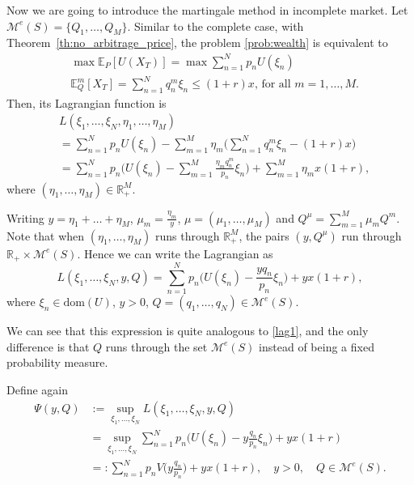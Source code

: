 \documentclass[a4paper]{article}
\theoremstyle{definition}
\numberwithin{equation}{section}
\begin{document}
Now we are going to introduce the martingale method in incomplete market. Let $\mathcal M^e(S)=\{Q_1,\dots,Q_M\}$.
Similar to the complete case, with Theorem~\ref{th:no_arbitrage_price}, the problem \eqref{prob:wealth} is equivalent to
\begin{equation}\label{incomplete problem}
\begin{aligned}
&\max\mathbb E_P[U(X_T)]=\max\sum^N_{n=1}p_nU(\xi_n)\\
&\mathbb E_Q^m[X_T]=\sum^N_{n=1}q^m_n\xi_n\leq (1+r)x\text{, for all }m=1,\dots,M.
\end{aligned}
\end{equation}
Then, its Lagrangian function is
\begin{equation}\nonumber
\begin{aligned}
&L(\xi_1,\dots,\xi_N,\eta_1,\dots,\eta_M)\\
&=\sum^N_{n=1}p_nU(\xi_n)-\sum^M_{m=1}\eta_m\big(\sum^N_{n=1}q^m_n\xi_n-(1+r)x\big)\\
&=\sum^N_{n=1}p_n\Big(U(\xi_n)-\sum^M_{m=1}\frac{\eta_mq^m_n}{p_n}\xi_n\Big)+\sum^M_{m=1}\eta_mx(1+r),
\end{aligned}
\end{equation}
where $(\eta_1,\dots,\eta_M)\in\mathbb R^M_+$.

Writing $y=\eta_1+\dots+\eta_M$, $\mu_m=\frac{\eta_m}{y}$, $\mu=(\mu_1,\dots,\mu_M)$ and $Q^\mu=\sum^M_{m=1}\mu_mQ^m$.
Note that when $(\eta_1,\dots,\eta_M)$ runs through $\mathbb R^M_+$, the pairs $(y,Q^\mu)$ run through $\mathbb R_+\times\mathcal M^e(S)$.
Hence we can write the Lagrangian as
\begin{equation}\label{lag2}
L(\xi_1,\dots,\xi_N,y,Q)=\sum^N_{n=1}p_n\big(U(\xi_n)-\frac{yq_n}{p_n}\xi_n\big)+yx(1+r),
\end{equation}
where $\xi_n\in\text{dom}(U)$, $y>0$, $Q=(q_1,\dots,q_N)\in\mathcal M^e(S)$.

We can see that this expression is quite analogous to \eqref{lag1}, and the only difference is that $Q$ runs through the set $\mathcal M^e(S)$ instead of being a fixed probability measure.

Define again
\begin{equation}\label{psi2y,q}
\begin{aligned}
\Psi(y,Q)
&:=\sup_{\xi_1,\dots,\xi_N}L(\xi_1,\dots,\xi_N,y,Q)\\
&=\sup_{\xi_1,\dots,\xi_N}\sum^N_{n=1}p_n\big(U(\xi_n)-y\frac{q_n}{p_n}\xi_n\big)+yx(1+r)\\
&=:\sum^N_{n=1}p_nV\big(y\frac{q_n}{p_n}\big)+yx(1+r),\quad y>0,\quad Q\in\mathcal M^e(S).
\end{aligned}
\end{equation}
\end{document}
